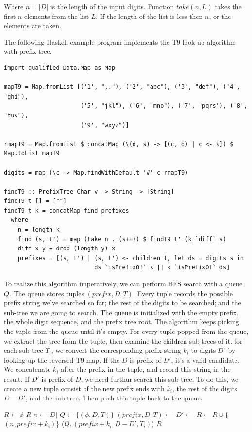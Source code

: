 \documentclass[b5paper]{article}
\begin{document}
Where $n = |D|$ is the length of the input digits. Function $take(n, L)$ takes the first $n$ elements from the list $L$. If the length of the list is less then $n$, or the elements are taken.

The following Haskell example program implements the T9 look up algorithm with prefix tree.

\lstset{language=Haskell}
\begin{lstlisting}
import qualified Data.Map as Map

mapT9 = Map.fromList [('1', ",."), ('2', "abc"), ('3', "def"), ('4', "ghi"),
                      ('5', "jkl"), ('6', "mno"), ('7', "pqrs"), ('8', "tuv"),
                      ('9', "wxyz")]

rmapT9 = Map.fromList $ concatMap (\(d, s) -> [(c, d) | c <- s]) $ Map.toList mapT9

digits = map (\c -> Map.findWithDefault '#' c rmapT9)

findT9 :: PrefixTree Char v -> String -> [String]
findT9 t [] = [""]
findT9 t k = concatMap find prefixes
  where
    n = length k
    find (s, t') = map (take n . (s++)) $ findT9 t' (k `diff` s)
    diff x y = drop (length y) x
    prefixes = [(s, t') | (s, t') <- children t, let ds = digits s in
                          ds `isPrefixOf` k || k `isPrefixOf` ds]
\end{lstlisting}

To realize this algorithm imperatively, we can perform BFS search with a queue $Q$.
The queue stores tuples $(prefix, D, T)$. Every tuple records the possible
prefix string we've searched so far; the rest of the digits to be searched;
and the sub-tree we are going to search. The queue is initialized with the
empty prefix, the whole digit sequence, and the prefix tree root. The algorithm
keeps picking the tuple from the queue until it's empty. For every tuple
popped from the queue, we extract the tree from the tuple, then examine the
children sub-trees of it. for each sub-tree $T_i$, we convert the corresponding
prefix string $k_i$ to digits $D'$ by looking up the reversed T9 map. If the
$D$ is prefix of $D'$, it's a valid candidate. We concatenate $k_i$ after
the prefix in the tuple, and record this string in the result. If $D'$ is
prefix of $D$, we need furthur search this sub-tree. To do this, we
create a new tuple consist of the new prefix ends with $k_i$, the rest of
the digits $D-D'$, and the sub-tree. Then push this tuple back to the queue.

\begin{algorithmic}[1]
  \State $R \gets \phi$
    \State \Return $R$
  \EndIf
  \State $n \gets |D|$
  \State $Q \gets \{(\phi, D, T)\}$
    \State $(prefix, D, T) \gets$ 
      \State $D' \gets$ 
       
        \State $R \gets R \cup \{$  $(n, prefix + k_i) \}$ 
        \State {}($Q, (prefix + k_i, D - D', T_i)$)
      \EndIf
    \EndFor
  \EndWhile
  \State \Return $R$
\EndFunction
\end{algorithmic}
\end{document}
